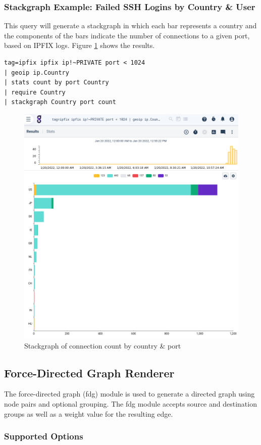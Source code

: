 \subsubsection{Stackgraph Example: Failed SSH Logins by Country \& User}

This query will generate a stackgraph in which each bar represents a country and the
components of the bars indicate the number of connections to a given port, based on IPFIX logs.
Figure \ref{fig:stackgraph-connections}
shows the results.

\begin{Verbatim}[breaklines=true]
tag=ipfix ipfix ip!~PRIVATE port < 1024 
| geoip ip.Country 
| stats count by port Country 
| require Country 
| stackgraph Country port count
\end{Verbatim}

\begin{figure}
	\includegraphics[width=0.6\linewidth]{images/stackgraph-connections.png}
	\caption{Stackgraph of connection count by country \& port}
	\label{fig:stackgraph-connections}
\end{figure}


\clearpage

\subsection{Force-Directed Graph Renderer}
The force-directed graph (fdg) module is used to generate a directed
graph using node pairs and optional grouping. The fdg module accepts
source and destination groups as well as a weight value for the
resulting edge.

\subsubsection{Supported Options}

